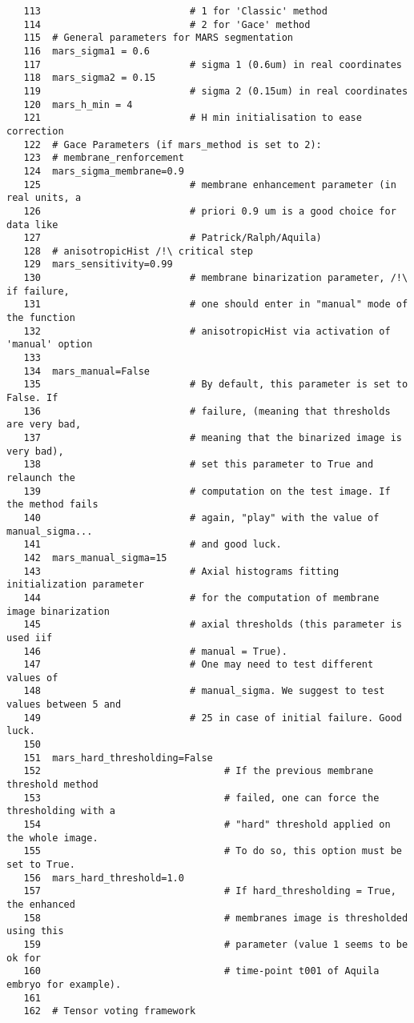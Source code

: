 \begin{verbatim}
   113	                        # 1 for 'Classic' method
   114				  			# 2 for 'Gace' method
   115	# General parameters for MARS segmentation
   116	mars_sigma1 = 0.6  		
   117	                        # sigma 1 (0.6um) in real coordinates
   118	mars_sigma2 = 0.15 		
   119	                        # sigma 2 (0.15um) in real coordinates
   120	mars_h_min = 4     		
   121	                        # H min initialisation to ease correction
   122	# Gace Parameters (if mars_method is set to 2):
   123	# membrane_renforcement
   124	mars_sigma_membrane=0.9 
   125	                        # membrane enhancement parameter (in real units, a 
   126							# priori 0.9 um is a good choice for data like 
   127							# Patrick/Ralph/Aquila)
   128	# anisotropicHist /!\ critical step
   129	mars_sensitivity=0.99   
   130	                        # membrane binarization parameter, /!\ if failure,
   131							# one should enter in "manual" mode of the function
   132							# anisotropicHist via activation of 'manual' option
   133	
   134	mars_manual=False     	
   135	                        # By default, this parameter is set to False. If 
   136							# failure, (meaning that thresholds are very bad, 
   137							# meaning that the binarized image is very bad),
   138					 		# set this parameter to True and relaunch the 
   139					 		# computation on the test image. If the method fails
   140					 		# again, "play" with the value of manual_sigma... 
   141					 		# and good luck.
   142	mars_manual_sigma=15    
   143	                        # Axial histograms fitting initialization parameter 
   144							# for the computation of membrane image binarization
   145							# axial thresholds (this parameter is used iif 
   146							# manual = True).
   147							# One may need to test different values of 
   148							# manual_sigma. We suggest to test values between 5 and
   149							# 25 in case of initial failure. Good luck.
   150	
   151	mars_hard_thresholding=False  
   152	                              # If the previous membrane threshold method 
   153								  # failed, one can force the thresholding with a
   154								  # "hard" threshold applied on the whole image. 
   155								  # To do so, this option must be set to True.
   156	mars_hard_threshold=1.0       
   157	                              # If hard_thresholding = True, the enhanced 
   158								  # membranes image is thresholded using this 
   159								  # parameter (value 1 seems to be ok for 
   160								  # time-point t001 of Aquila embryo for example).
   161	
   162	# Tensor voting framework

\end{verbatim}
